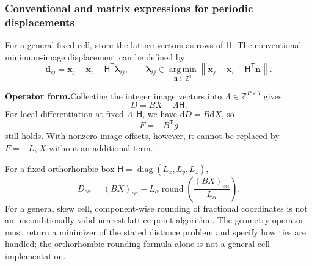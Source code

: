 \documentclass[11pt,a4paper]{article}
\newcommand{\newform}{\par\noindent\textbf{Operator form.}\quad}
\newcommand{\ZZ}{\mathbb Z}
\newcommand{\dd}{\mathrm d}
\newcommand{\diag}{\operatorname{diag}}
\newcommand{\round}{\operatorname{round}}
\newcommand{\argmin}{\operatorname*{arg\,min}}
\newcommand{\norm}[1]{\left\lVert #1\right\rVert}
\newcommand{\vect}[1]{\bm{#1}}
\newcommand{\cell}{\mathsf H}
\theoremstyle{definition}
\begin{document}
\subsubsection{Conventional and matrix expressions for periodic displacements}
For a general fixed cell, store the lattice vectors as rows of $\cell$. The conventional
minimum-image displacement can be defined by
\begin{equation}
\vect d_{ij}=\vect x_j-\vect x_i-\cell^{\mathsf T}\vect\lambda_{ij},\qquad
\vect\lambda_{ij}\in\argmin_{\vect n\in\ZZ^3}
\norm{\vect x_j-\vect x_i-\cell^{\mathsf T}\vect n}.
\end{equation}
\newform Collecting the integer image vectors into $\Lambda\in\ZZ^{P\times3}$ gives
\begin{equation}
D=BX-\Lambda\cell.
\label{eq:pbc-matrix}
\end{equation}
For local differentiation at fixed $\Lambda,\cell$, we have $\dd D=B\dd X$, so
\begin{equation}
F=-B^{\mathsf T}g
\end{equation}
still holds. With nonzero image offsets, however, it cannot be replaced by $F=-L_wX$ without an
additional term.

For a fixed orthorhombic box $\cell=\diag(L_x,L_y,L_z)$,
\begin{equation}
D_{e\alpha}=(BX)_{e\alpha}-L_\alpha
\round\!\left(\frac{(BX)_{e\alpha}}{L_\alpha}\right).
\end{equation}
For a general skew cell, component-wise rounding of fractional coordinates is not an
unconditionally valid nearest-lattice-point algorithm. The geometry operator must return a
minimizer of the stated distance problem and specify how ties are handled; the orthorhombic
rounding formula alone is not a general-cell implementation.
\end{document}

